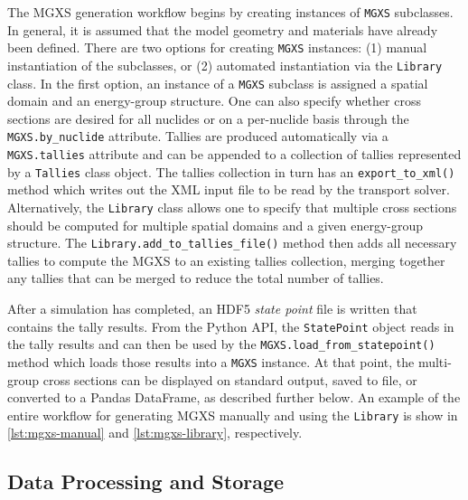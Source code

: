 The MGXS generation workflow begins by creating instances of \texttt{MGXS} subclasses. In general, it is assumed that the model geometry and materials have already been defined. There are two options for creating \texttt{MGXS} instances: (1) manual instantiation of the subclasses, or (2) automated instantiation via the \texttt{Library} class. In the first option, an instance of a \texttt{MGXS} subclass is assigned a spatial domain and an energy-group structure. One can also specify whether cross sections are desired for all nuclides or on a per-nuclide basis through the \texttt{MGXS.by_nuclide} attribute. Tallies are produced automatically via a \texttt{MGXS.tallies} attribute and can be appended to a collection of tallies represented by a \texttt{Tallies} class object. The tallies collection in turn has an \texttt{export_to_xml()} method which writes out the XML input file to be read by the transport solver. Alternatively, the \texttt{Library} class allows one to specify that multiple cross sections should be computed for multiple spatial domains and a given energy-group structure. The \texttt{Library.add_to_tallies_file()} method then adds all necessary tallies to compute the MGXS to an existing tallies collection, merging together any tallies that can be merged to reduce the total number of tallies.

After a simulation has completed, an HDF5 \emph{state point} file is written
that contains the tally results. From the Python API, the \texttt{StatePoint}
object reads in the tally results and can then be used by the
\texttt{MGXS.load_from_statepoint()} method which loads those results into a
\texttt{MGXS} instance. At that point, the multi-group cross sections can be displayed on standard output, saved to file, or converted to a Pandas DataFrame, as described further below. An example of the entire workflow for generating MGXS manually and using the \texttt{Library} is show in \cref{lst:mgxs-manual} and \cref{lst:mgxs-library}, respectively.






\subsection{Data Processing and Storage}
\label{subsec:data-processing}

